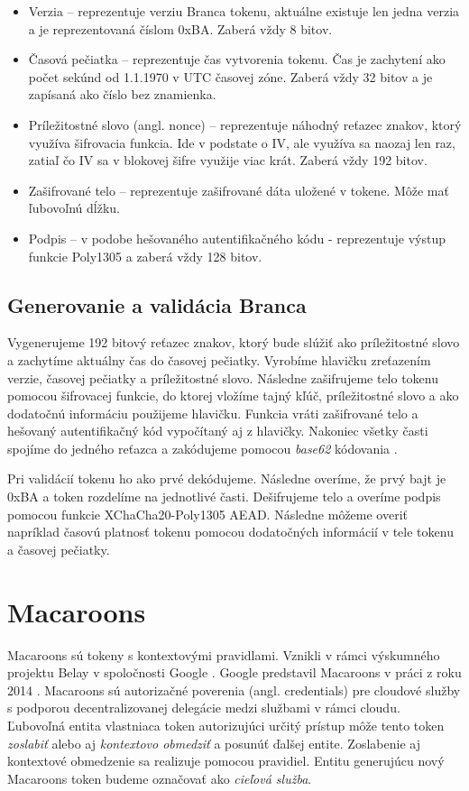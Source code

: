 \begin{itemize}
    \item Verzia -- reprezentuje verziu Branca tokenu, aktuálne existuje len jedna verzia a je reprezentovaná číslom 0xBA. Zaberá vždy 8 bitov.
    \item Časová pečiatka -- reprezentuje čas vytvorenia tokenu. Čas je zachytení ako počet sekúnd od 1.1.1970 v UTC časovej zóne. Zaberá vždy 32 bitov a je zapísaná ako číslo bez znamienka.
    \item Príležitostné slovo (angl. nonce) -- reprezentuje náhodný reťazec znakov, ktorý využíva šifrovacia funkcia. Ide v podstate o IV, ale využíva sa naozaj len raz, zatiaľ čo IV sa v blokovej šifre využije viac krát. Zaberá vždy 192 bitov.
    \item Zašifrované telo -- reprezentuje zašifrované dáta uložené v tokene. Môže mať ľubovoľnú dĺžku.
    \item Podpis -- v podobe hešovaného autentifikačného kódu - reprezentuje výstup funkcie Poly1305 a zaberá vždy 128 bitov.
\end{itemize}

\subsection{Generovanie a validácia Branca}

Vygenerujeme 192 bitový reťazec znakov, ktorý bude slúžiť ako príležitostné slovo a zachytíme aktuálny čas do časovej pečiatky. Vyrobíme hlavičku zreťazením verzie, časovej pečiatky a príležitostné slovo. Následne zašifrujeme telo tokenu pomocou šifrovacej funkcie, do ktorej vložíme tajný kľúč, príležitostné slovo a ako dodatočnú informáciu použijeme hlavičku. Funkcia vráti zašifrované telo a hešovaný autentifikačný kód vypočítaný aj z hlavičky. Nakoniec všetky časti spojíme do jedného reťazca a zakódujeme pomocou \textit{base62} kódovania \cite{base62}.

Pri validácií tokenu ho ako prvé dekódujeme. Následne overíme, že prvý bajt je 0xBA a token rozdelíme na jednotlivé časti. Dešifrujeme telo a overíme podpis pomocou funkcie XChaCha20-Poly1305 AEAD. Následne môžeme overiť napríklad časovú platnosť tokenu pomocou dodatočných informácií v tele tokenu a časovej pečiatky.

\section{Macaroons}

Macaroons sú tokeny s kontextovými pravidlami. Vznikli v rámci výskumného projektu Belay v spoločnosti Google \cite{belay}. Google predstavil Macaroons v práci z roku 2014 \cite{macaroons_paper}. Macaroons sú autorizačné poverenia (angl. credentials) pre cloudové služby s podporou decentralizovanej delegácie medzi službami v rámci cloudu. Ľubovoľná entita vlastniaca token autorizujúci určitý prístup môže tento token \textit{zoslabiť} alebo aj \textit{kontextovo obmedziť} a posunúť ďalšej entite. Zoslabenie aj kontextové obmedzenie sa realizuje pomocou pravidiel. Entitu generujúcu nový Macaroons token budeme označovať ako \textit{cieľová služba}.

